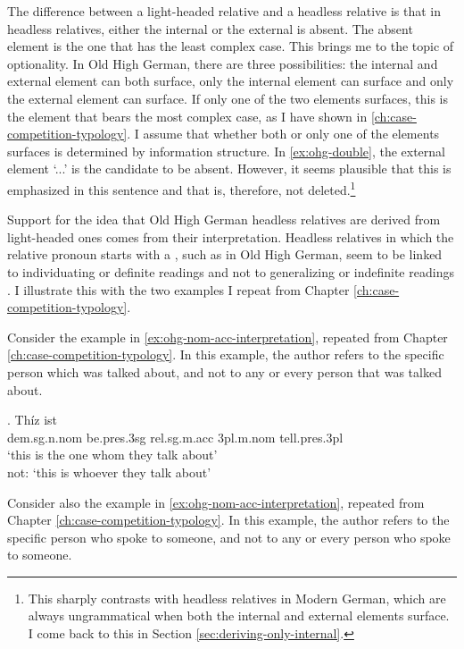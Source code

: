 The difference between a light-headed relative and a headless relative is that in headless relatives, either the internal or the external is absent. The absent element is the one that has the least complex case. This brings me to the topic of optionality. In Old High German, there are three possibilities: the internal and external element can both surface, only the internal element can surface and only the external element can surface. If only one of the two elements surfaces, this is the element that bears the most complex case, as I have shown in \ref{ch:case-competition-typology}. I assume that whether both or only one of the elements surfaces is determined by information structure. In \ref{ex:ohg-double}, the external element  `...' is the candidate to be absent. However, it seems plausible that this is emphasized in this sentence and that is, therefore, not deleted.\footnote{
This sharply contrasts with headless relatives in Modern German, which are always ungrammatical when both the internal and external elements surface. I come back to this in Section \ref{sec:deriving-only-internal}.
}

Support for the idea that Old High German headless relatives are derived from light-headed ones comes from their interpretation. Headless relatives in which the relative pronoun starts with a , such as in Old High German, seem to be linked to individuating or definite readings and not to generalizing or indefinite readings \cite[cf.][]{fuss2017}. I illustrate this with the two examples I repeat from Chapter  \ref{ch:case-competition-typology}.

Consider the example in \ref{ex:ohg-nom-acc-interpretation}, repeated from Chapter \ref{ch:case-competition-typology}.
In this example, the author refers to the specific person which was talked about, and not to any or every person that was talked about.

\exg. Thíz ist   \\
\ac{dem}.\ac{sg}.\ac{n}.\ac{nom} be.\ac{pres}.3\ac{sg}\scsub{[nom]} \ac{rel}.\ac{sg}.\ac{m}.\ac{acc}
3\ac{pl}.\ac{m}.\ac{nom} tell.\ac{pres}.3\ac{pl}\scsub{[acc]}\\
`this is the one whom they talk about'\\
not: `this is whoever they talk about' \label{ex:ohg-nom-acc-interpretation}

Consider also the example in \ref{ex:ohg-nom-acc-interpretation}, repeated from Chapter \ref{ch:case-competition-typology}.
In this example, the author refers to the specific person who spoke to someone, and not to any or every person who spoke to someone.

